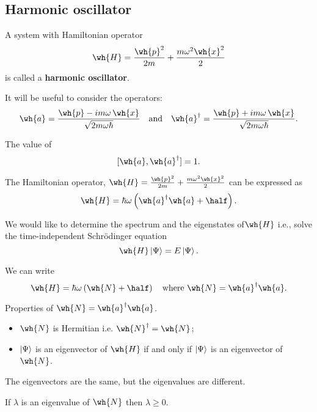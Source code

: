 \documentclass[12pt, a4paper]{article}
\begin{document}
\subsection{Harmonic oscillator}

\begin{definition}
    A system with Hamiltonian operator 
    \[\wh{H}=\frac{\wh{p}^2}{2m}+\frac{m\omega^2 \wh{x}^2}{2}\]
    is called a \textbf{harmonic oscillator}.
\end{definition}

\noindent It will be useful to consider the operators:
\[\wh{a} = \frac{\wh{p}-im\omega \, \wh{x}}{\sqrt{2m\omega \hbar}} 
\quad \text{and} \quad
\wh{a}^{\dagger} = \frac{\wh{p}+im\omega \, \wh{x}}{\sqrt{2m\omega \hbar}}.\]

\begin{proposition}
    The value of 
    \[[\wh{a},\wh{a}^{\dagger}]=1.\]
\end{proposition}

\begin{mdthm}
    The Hamiltonian operator, \(\wh{H}=\frac{\wh{p}^2}{2m}+\frac{m\omega^2 \wh{x}^2}{2}\) can be expressed as
    \[\wh{H}=\hbar \omega \left( \wh{a}^{\dagger} \wh{a} + \half \right).\]
\end{mdthm}

We would like to determine the spectrum and the eigenstates of\(\wh{H}\) i.e., solve the time-independent Schrödinger equation 
\[\wh{H} \ket{\Psi} = E \ket{\Psi}.\]

We can write
\[\wh{H}=\hbar\omega \left(\wh{N} +\half\right) \quad \text{where } \wh{N}=\wh{a}^{\dagger}\wh{a}.\]

\begin{proposition}
    Properties of \(\wh{N}=\wh{a}^{\dagger}\wh{a}\).
    \begin{itemize}
        \item \(\wh{N}\) is Hermitian i.e. \(\wh{N}^{\dagger}=\wh{N}\);
        \item \(\ket{\Psi}\) is an eigenvector of \(\wh{H}\) if and only if \(\ket{\Psi}\) is an eigenvector of \(\wh{N}\).
    \end{itemize}
\end{proposition}

\begin{mdnote}
    The eigenvectors are the same, but the eigenvalues are different.
\end{mdnote}

\begin{lemma}
    If \(\lambda\) is an eigenvalue of \(\wh{N}\) then \(\lambda \geq 0\).
\end{lemma}
\end{document}
